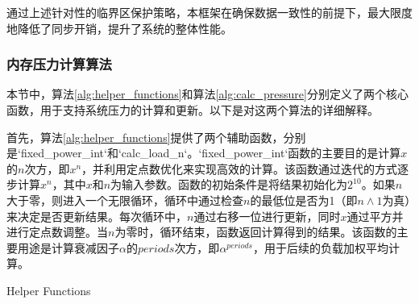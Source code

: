 通过上述针对性的临界区保护策略，本框架在确保数据一致性的前提下，最大限度地降低了同步开销，提升了系统的整体性能。


\subsubsection{内存压力计算算法}

本节中，算法\ref{alg:helper_functions}和算法\ref{alg:calc_pressure}分别定义了两个核心函数，用于支持系统压力的计算和更新。以下是对这两个算法的详细解释。

首先，算法\ref{alg:helper_functions}提供了两个辅助函数，分别是`fixed\_power\_int`和`calc\_load\_n`。`fixed\_power\_int`函数的主要目的是计算$x$的$n$次方，即$x^n$，并利用定点数优化来实现高效的计算。该函数通过迭代的方式逐步计算$x^n$，其中$x$和$n$为输入参数。函数的初始条件是将结果初始化为$2^{10}$。如果$n$大于零，则进入一个无限循环，循环中通过检查$n$的最低位是否为1（即$n \land 1$为真）来决定是否更新结果。每次循环中，$n$通过右移一位进行更新，同时$x$通过平方并进行定点数调整。当$n$为零时，循环结束，函数返回计算得到的结果。该函数的主要用途是计算衰减因子$\alpha$的$periods$次方，即$\alpha^{periods}$，用于后续的负载加权平均计算。
\begin{algorithm}[h]
    \caption{Helper Functions}
    \label{alg:helper_functions}


    \BlankLine

\end{algorithm}
